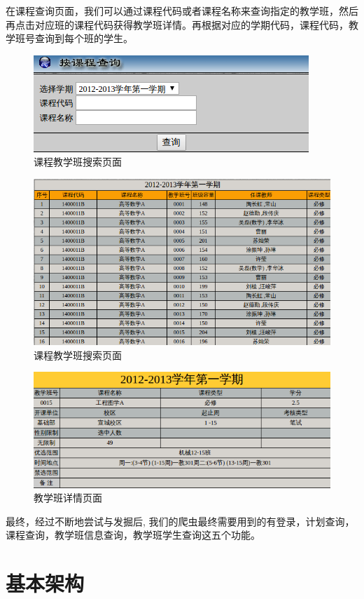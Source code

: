 \documentclass[UTF8, zihao=-4]{ctexart}
\begin{document}
    在课程查询页面，我们可以通过课程代码或者课程名称来查询指定的教学班，然后再点击对应班的课程代码获得教学班详情。再根据对应的学期代码，课程代码，教学班号查询到每个班的学生。
    
    \begin{figure}
        \centering
        \includegraphics[width=0.5\linewidth]{figure/interface-search-course}
        \caption{课程教学班搜索页面}
        \label{fig:interface-search-course}
    \end{figure}
    
    \begin{figure}
        \centering
        \includegraphics[width=0.5\linewidth]{figure/interface-search-result}
        \caption{课程教学班搜索页面}
        \label{fig:interface-search-result}
    \end{figure}
    
    \begin{figure}
        \centering
        \includegraphics[width=0.5\linewidth]{figure/interface-class-info}
        \caption{教学班详情页面}
        \label{fig:interface-class-info}
    \end{figure}

    最终，经过不断地尝试与发掘后, 我们的爬虫最终需要用到的有登录，计划查询，课程查询，教学班信息查询，教学班学生查询这五个功能。
    
    \section{基本架构}
    
\end{document}

